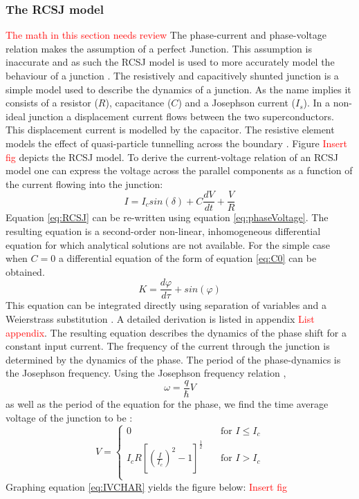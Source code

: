 \subsubsection*{The RCSJ model}
\textcolor{red}{The math in this section needs review}
The phase-current and phase-voltage relation makes the assumption of a perfect Junction. This assumption is inaccurate and as such the RCSJ model is used to more accurately model the behaviour of a junction \cite{Tinkham_2015}. The resistively and capacitively shunted junction is a simple model used to describe the dynamics of a junction. As the name implies it consists of a resistor ($R$), capacitance ($C$) and a Josephson current ($I_s$). In a non-ideal junction a displacement current flows between the two superconductors. This displacement current is modelled by the capacitor. The resistive element models the effect of quasi-particle tunnelling across the boundary \cite{Duzer_1999_Princip_Super}. Figure \textcolor{red}{Insert fig} depicts the RCSJ model. To derive the current-voltage relation of an RCSJ model one can express the voltage across the parallel components as a function of the current flowing into the junction: 
\begin{equation}
    I = I_csin(\delta)+C\frac{dV}{dt}+\frac{V}{R}
    \label{eq:RCSJ}
\end{equation}
Equation \ref{eq:RCSJ} can be re-written using equation \ref{eq:phaseVoltage}. The resulting equation is a second-order non-linear, inhomogeneous differential equation for which analytical solutions are not available. For the simple case when $C=0$ a differential equation of the form of equation \ref{eq:C0} can be obtained.
\begin{equation}
    K = \frac{d\varphi }{d\tau} + sin(\varphi)
    \label{eq:C0}
\end{equation}
This equation can be integrated directly using separation of variables and a Weierstrass substitution \cite{Duzer_1999_Princip_Super}. A detailed derivation is listed in appendix \textcolor{red}{List appendix}. The resulting equation describes the dynamics of the phase shift for a constant input current. The frequency of the current through the junction is determined by the dynamics of the phase. The period of the phase-dynamics is the Josephson frequency. Using the Josephson frequency relation \cite{Duzer_1999_Princip_Super},
\begin{equation}
    \omega = \frac{q}{\hbar}V
    \label{eq:JosephsonFreq}
\end{equation}
as well as the period of the equation for the phase, we find the time average voltage of the junction to be \cite{Duzer_1999_Princip_Super}:
\begin{equation}
    V = 
    \begin{cases}
        0 & \quad\text{for } I \le I_c\\
        I_cR[(\frac{I}{I_c})^2-1]^\frac{1}{2} & \quad\text{for } I > I_c\\
    \end{cases}
    \label{eq:IVCHAR}
\end{equation}
Graphing equation \ref{eq:IVCHAR} yields the figure below: \textcolor{red}{Insert fig}


